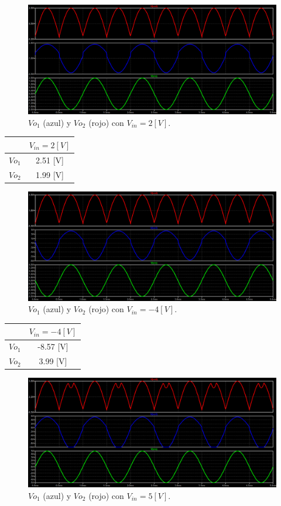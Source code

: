 \begin{figure}[H]
	\centering
	\includegraphics[width=1\textwidth]{figuras/Vo1_Vo2_Vin=2.png}
	\caption{$Vo_1$ (azul) y $Vo_2$ (rojo) con $V_{in}=2[V]$.}
\end{figure}
\begin{center}
	\begin{tabular}{| c | c |}
		\hline
		& $V_{in}= 2[V]$ \\ \hline
		$Vo_1$ 	&  	2.51 [V]	 \\
		$Vo_2$ 	& 	1.99 [V]	 \\ \hline
	\end{tabular}
\end{center}
\begin{figure}[H]
	\centering
	\includegraphics[width=1\textwidth]{figuras/Vo1_Vo2_Vin=-4.png}
	\caption{$Vo_1$ (azul) y $Vo_2$ (rojo) con $V_{in}=-4[V]$.}
\end{figure}
\begin{center}
	\begin{tabular}{| c | c |}
		\hline
		& $V_{in}= -4[V]$ \\ \hline
		$Vo_1$ 	&  	-8.57 [V]	 \\
		$Vo_2$ 	& 	 3.99 [V]	 \\ \hline
	\end{tabular}
\end{center}
\begin{figure}[H]
	\centering
	\includegraphics[width=1\textwidth]{figuras/Vo1_Vo2_Vin=5.png}
	\caption{$Vo_1$ (azul) y $Vo_2$ (rojo) con $V_{in}=5[V]$.}
\end{figure}
